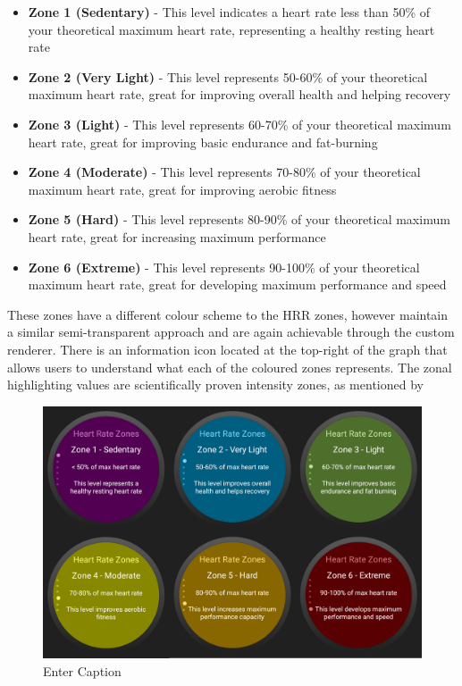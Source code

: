 \documentclass{l4proj}
\begin{document}
\begin{itemize}
    \item \textbf{Zone 1 (Sedentary)} - This level indicates a heart rate less than 50\% of your theoretical maximum heart rate, representing a healthy resting heart rate
    \item \textbf{Zone 2 (Very Light)} - This level represents 50-60\% of your theoretical maximum heart rate, great for improving overall health and helping recovery
    \item \textbf{Zone 3 (Light)} - This level represents 60-70\% of your theoretical maximum heart rate, great for improving basic endurance and fat-burning
    \item \textbf{Zone 4 (Moderate)} - This level represents 70-80\% of your theoretical maximum heart rate, great for improving aerobic fitness
    \item \textbf{Zone 5 (Hard)} - This level represents 80-90\% of your theoretical maximum heart rate, great for increasing maximum performance
    \item \textbf{Zone 6 (Extreme)} - This level represents 90-100\% of your theoretical maximum heart rate, great for developing maximum performance and speed
\end{itemize}

These zones have a different colour scheme to the HRR zones, however maintain a similar semi-transparent approach and are again achievable through the custom renderer. There is an information icon located at the top-right of the graph that allows users to understand what each of the coloured zones represents. The zonal highlighting values are scientifically proven intensity zones, as mentioned by \cite{8025953}

\begin{figure}[h!]
    \centering
    \includegraphics[width=0.75\linewidth]{dissertation//dissImages/HRZonesCombined.png}
    \caption{Enter Caption}
    \label{fig:enter-label}
\end{figure}
\end{document}
